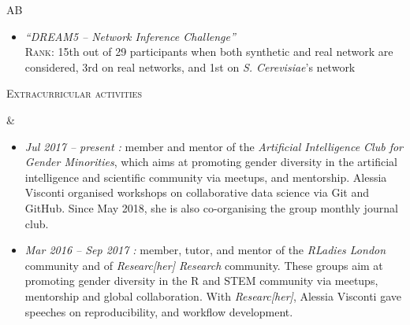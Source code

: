 \documentclass[a4paper,10pt]{article}
\newenvironment{doubletablelist}
{
	\vspace{-0.2cm}
	\begin{longtable}[!h]{AB}}{\end{longtable}
}
\newcommand{\dtlist}[2]{
\hspace{-3cm}
\noindent
	\begin{minipage}{0.22\textwidth}
	\begin{flushright}
	\textsc{#1}
	\end{flushright}
	\end{minipage}
	& #2\\[0.2cm]
}
\newcommand{\graybulletitem}{ \item[\textcolor{gray}{$\bullet$}]}
\newcommand{\minusitem}{\item[-]}
\begin{document}
\begin{doubletablelist}
{\begin{itemize}
		\graybulletitem   \begin{minipage}[t]{0.65\textwidth}
			\emph{``DREAM5 -- Network Inference Challenge''}\\
			\textsc{Rank:} 15th out of 29 participants when both synthetic and real network are considered, 3rd on real networks, and 1st on \emph{S. Cerevisiae}'s network
		\end{minipage}	
	\end{itemize}
}
	




\dtlist{Extracurricular activities}{
	\vspace{-0.9cm}
	\begin{itemize}[itemsep=-0.5ex]
		\graybulletitem \emph{Jul 2017 -- present : } member and mentor of the \emph{Artificial Intelligence Club for Gender Minorities}, which aims at promoting gender diversity in the artificial intelligence and scientific community via meetups, and mentorship. Alessia Visconti organised workshops on collaborative data science via Git and GitHub. Since May 2018, she is also co-organising the group monthly journal club.
		\graybulletitem  \emph{Mar 2016 -- Sep 2017 : } member, tutor, and mentor of the \emph{RLadies London} community and of \emph{Researc[her] Research} community. These groups aim at promoting gender diversity in the R and STEM community via meetups, mentorship and global collaboration. With \emph{Researc[her]}, Alessia Visconti gave speeches on reproducibility, and workflow development.
	\end{itemize}
}

\end{doubletablelist}
\end{document}

